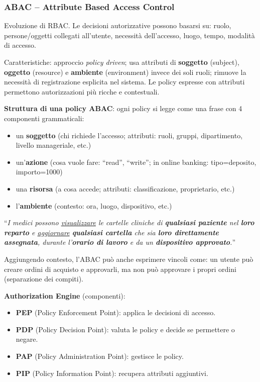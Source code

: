\documentclass[a4paper,11pt]{article}
\begin{document}
\subsubsection{ABAC -- Attribute Based Access Control}

\begin{definizione}[ABAC]
Evoluzione di RBAC. Le decisioni autorizzative possono basarsi su: ruolo, persone/oggetti collegati all'utente, necessit\`{a} dell'accesso, luogo, tempo, modalit\`{a} di accesso.

Caratteristiche: approccio \emph{policy driven}; usa attributi di \textbf{soggetto} (subject), \textbf{oggetto} (resource) e \textbf{ambiente} (environment) invece dei soli ruoli; rimuove la necessit\`{a} di registrazione esplicita nel sistema. Le policy espresse con attributi permettono autorizzazioni più ricche e contestuali.

\textbf{Struttura di una policy ABAC}: ogni policy si legge come una frase con 4 componenti grammaticali:
\begin{itemize}
  \item un \textbf{soggetto} (chi richiede l'accesso; attributi: ruoli, gruppi, dipartimento, livello manageriale, etc.)
  \item un'\textbf{azione} (cosa vuole fare: ``read'', ``write''; in online banking: tipo=deposito, importo=1000)
  \item una \textbf{risorsa} (a cosa accede; attributi: classificazione, proprietario, etc.)
  \item l'\textbf{ambiente} (contesto: ora, luogo, dispositivo, etc.)
\end{itemize}

\begin{esempio}
``\emph{I medici possono \underline{visualizzare} le cartelle cliniche di \textbf{qualsiasi paziente} nel \textbf{loro reparto} e \underline{aggiornare} \textbf{qualsiasi cartella} che sia \textbf{loro direttamente assegnata}, durante l'\textbf{orario di lavoro} e da un \textbf{dispositivo approvato}.}''

Aggiungendo contesto, l'ABAC pu\`{o} anche esprimere vincoli come: un utente pu\`{o} creare ordini di acquisto e approvarli, ma non pu\`{o} approvare i propri ordini (separazione dei compiti).
\end{esempio}

\textbf{Authorization Engine} (componenti):
\begin{itemize}
  \item \textbf{PEP} (Policy Enforcement Point): applica le decisioni di accesso.
  \item \textbf{PDP} (Policy Decision Point): valuta le policy e decide se permettere o negare.
  \item \textbf{PAP} (Policy Administration Point): gestisce le policy.
  \item \textbf{PIP} (Policy Information Point): recupera attributi aggiuntivi.
\end{itemize}


\end{definizione}
\end{document}
